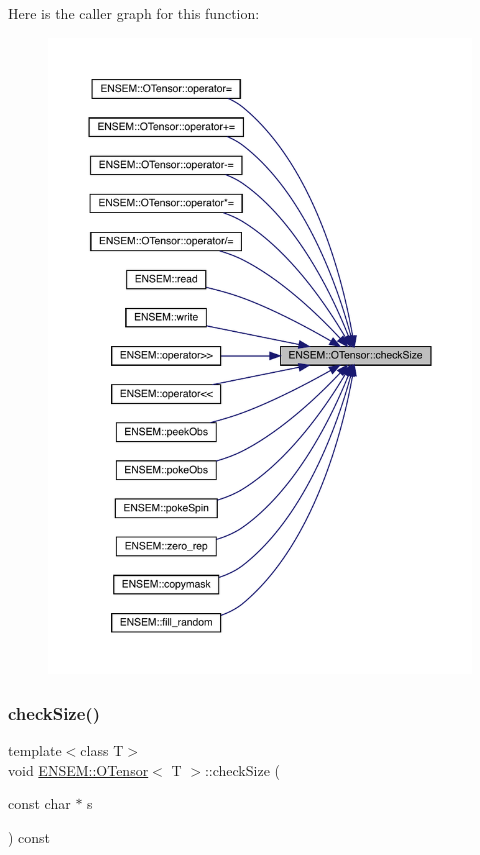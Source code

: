 Here is the caller graph for this function\+:
\nopagebreak
\begin{figure}[H]
\begin{center}
\leavevmode
\includegraphics[width=350pt]{da/d8a/classENSEM_1_1OTensor_a09bfbf9385ec1bbe5050d4df43850f63_icgraph}
\end{center}
\end{figure}
\mbox{\label{classENSEM_1_1OTensor_a09bfbf9385ec1bbe5050d4df43850f63}} 
\subsubsection{\texorpdfstring{checkSize()}{checkSize()}\hspace{0.1cm}{\footnotesize\ttfamily [3/6]}}
{\footnotesize\ttfamily template$<$class T$>$ \\
void \mbox{\hyperlink{classENSEM_1_1OTensor}{E\+N\+S\+E\+M\+::\+O\+Tensor}}$<$ T $>$\+::check\+Size (\begin{DoxyParamCaption}\item[{const char $\ast$}]{s }\end{DoxyParamCaption}) const\hspace{0.3cm}{\ttfamily [inline]}}

